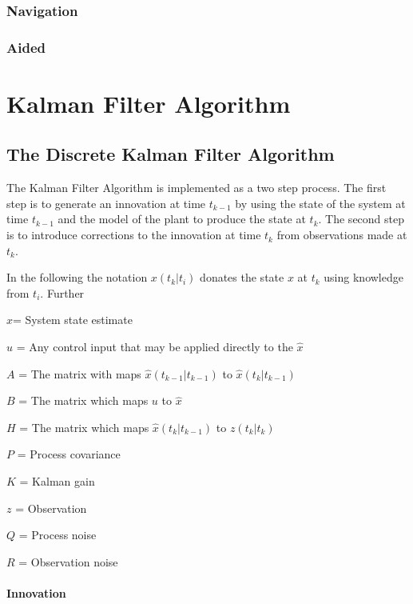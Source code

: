 \documentclass[a4paper]{report}
\numberwithin{equation}{chapter}
\begin{document}
\subsection[Navigate]{Navigation}

\subsection[Aided]{Aided}

\appendix

\clearpage\setcounter{page}{1}
\chapter[Kalman Filter Algorithm]{Kalman Filter Algorithm}

\section[The Discrete Kalman Filter Algorithm]{The Discrete Kalman Filter Algorithm}

The Kalman Filter Algorithm is implemented as a two step process. The first step is to generate an innovation at time $t_{k-1}$ by using the state of the system at time $t_{k - 1}$ and the model of the plant to produce the state at $t_k$. The second step is to introduce corrections to the innovation at time $t_k$ from observations made at $t_k$.

\bigskip

In the following the notation $x \left( t_k|t_i \right)$ donates the state $x$ at $t_k$ using knowledge from $t_i$. Further

$\hat{x}$= System state estimate

$u$ = Any control input that may be applied directly to the $\hat{x}$

$A$ = The matrix with maps $\hat{x} \left( t_{k - 1}|t_{k - 1} \right)$ to $\hat{x} \left( t_k|t_{k - 1} \right)$

$B$ = The matrix which maps $u$ to $\hat{x}$

$H$ = The matrix which maps $\hat{x} \left( t_k|t_{k - 1} \right)$ to $z \left( t_k|t_k \right)$

$P$ = Process covariance

$K$ = Kalman gain

$z$ = Observation

$Q$ = Process noise

$R$ = Observation noise

\subsubsection[Innovation]{Innovation}
\end{document}
